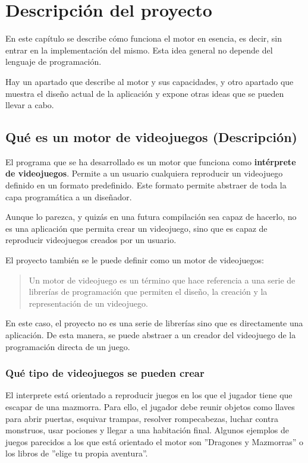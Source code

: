 \chapter{Descripción del proyecto}
En este capítulo se describe cómo funciona el motor en esencia, es decir, sin entrar en la implementación del mismo. Esta idea general no depende del lenguaje de programación.

Hay un apartado que describe al motor y sus capacidades, y otro apartado que muestra el diseño actual de la aplicación y expone otras ideas que se pueden llevar a cabo.

\section{Qué es un motor de videojuegos (Descripción)}

El programa que se ha desarrollado es un motor que funciona como \textbf{intérprete de videojuegos}. Permite a un usuario cualquiera reproducir un videojuego definido en un formato predefinido. Este formato permite abstraer de toda la capa programática a un diseñador.

Aunque lo parezca, y quizás en una futura compilación sea capaz de hacerlo, no es una aplicación que permita crear un videojuego, sino que es capaz de reproducir videojuegos creados por un usuario.

El proyecto también se le puede definir como un motor de videojuegos:
\begin{quote}
	\small Un motor de videojuego es un término que hace referencia a una serie de librerías de programación que permiten el diseño, la creación y la representación de un videojuego. \cite{Alberto_Carrasco}
\end{quote}

En este caso, el proyecto no es una serie de librerías sino que es directamente una aplicación. De esta manera, se puede abstraer a un creador del videojuego de la programación directa de un juego.

\subsection{Qué tipo de videojuegos se pueden crear}
El interprete está orientado a reproducir juegos en los que el jugador tiene que escapar de una mazmorra. Para ello, el jugador debe reunir objetos como llaves para abrir puertas, esquivar trampas, resolver rompecabezas, luchar contra monstruos, usar pociones y llegar a una habitación final.
Algunos ejemplos de juegos parecidos a los que está orientado el motor son ''Dragones y Mazmorras'' o los libros de ''elige tu propia aventura''.


